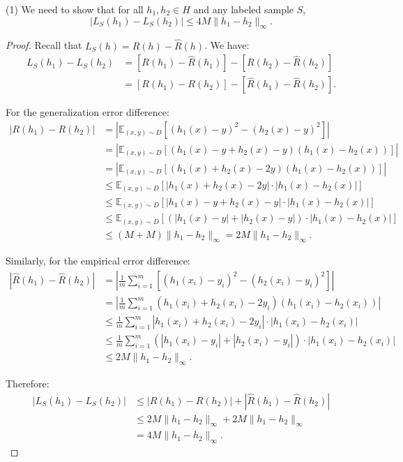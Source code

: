 \documentclass[letterpaper, 11pt]{article}
\newcommand{\1}{\mathds{1}}	%
\theoremstyle{definition}
\begin{document}
(1)
We need to show that for all $h_1, h_2 \in H$ and any labeled sample $S$,
\[
|L_S(h_1) - L_S(h_2)| \leq 4M \|h_1 - h_2\|_\infty.
\]

\begin{proof}
Recall that $L_S(h) = R(h) - \widehat{R}(h)$. We have:
\begin{align*}
L_S(h_1) - L_S(h_2) &= [R(h_1) - \widehat{R}(h_1)] - [R(h_2) - \widehat{R}(h_2)]\\
&= [R(h_1) - R(h_2)] - [\widehat{R}(h_1) - \widehat{R}(h_2)].
\end{align*}

For the generalization error difference:
\begin{align*}
|R(h_1) - R(h_2)| &= \left|\mathbb{E}_{(x,y) \sim D}[(h_1(x) - y)^2 - (h_2(x) - y)^2]\right|\\
&= \left|\mathbb{E}_{(x,y) \sim D}[(h_1(x) - y + h_2(x) - y)(h_1(x) - h_2(x))]\right|\\
&= \left|\mathbb{E}_{(x,y) \sim D}[(h_1(x) + h_2(x) - 2y)(h_1(x) - h_2(x))]\right|\\
&\leq \mathbb{E}_{(x,y) \sim D}[|h_1(x) + h_2(x) - 2y| \cdot |h_1(x) - h_2(x)|]\\
&\leq \mathbb{E}_{(x,y) \sim D}[|h_1(x) - y + h_2(x) - y| \cdot |h_1(x) - h_2(x)|]\\
&\leq \mathbb{E}_{(x,y) \sim D}[(|h_1(x) - y| + |h_2(x) - y|) \cdot |h_1(x) - h_2(x)|]\\
&\leq (M + M) \|h_1 - h_2\|_\infty = 2M \|h_1 - h_2\|_\infty.
\end{align*}

Similarly, for the empirical error difference:
\begin{align*}
|\widehat{R}(h_1) - \widehat{R}(h_2)| &= \left|\frac{1}{m}\sum_{i=1}^m [(h_1(x_i) - y_i)^2 - (h_2(x_i) - y_i)^2]\right|\\
&= \left|\frac{1}{m}\sum_{i=1}^m (h_1(x_i) + h_2(x_i) - 2y_i)(h_1(x_i) - h_2(x_i))\right|\\
&\leq \frac{1}{m}\sum_{i=1}^m |h_1(x_i) + h_2(x_i) - 2y_i| \cdot |h_1(x_i) - h_2(x_i)|\\
&\leq \frac{1}{m}\sum_{i=1}^m (|h_1(x_i) - y_i| + |h_2(x_i) - y_i|) \cdot |h_1(x_i) - h_2(x_i)|\\
&\leq 2M \|h_1 - h_2\|_\infty.
\end{align*}

Therefore:
\begin{align*}
|L_S(h_1) - L_S(h_2)| &\leq |R(h_1) - R(h_2)| + |\widehat{R}(h_1) - \widehat{R}(h_2)|\\
&\leq 2M \|h_1 - h_2\|_\infty + 2M \|h_1 - h_2\|_\infty\\
&= 4M \|h_1 - h_2\|_\infty.
\end{align*}
\end{proof}
\end{document}
